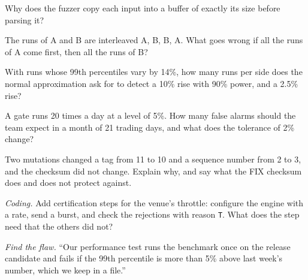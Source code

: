 \begin{exercise}[$\star$]\label{exo:ll:testing-and-deploying-low-latency-systems:2}
Why does the fuzzer copy each input into a buffer of exactly its size before parsing it?
\end{exercise}

\begin{exercise}[$\star$]\label{exo:ll:testing-and-deploying-low-latency-systems:3}
The runs of A and B are interleaved A, B, B, A. What goes wrong if all the runs of A come first, then all the runs of B?
\end{exercise}

\begin{exercise}[$\star\star$]\label{exo:ll:testing-and-deploying-low-latency-systems:4}
With runs whose 99th percentiles vary by 14\%, how many runs per side does the normal approximation ask for to detect a 10\%
rise with 90\% power, and a 2.5\% rise?
\end{exercise}

\begin{exercise}[$\star\star$]\label{exo:ll:testing-and-deploying-low-latency-systems:5}
A gate runs 20 times a day at a level of 5\%. How many false alarms should the team expect in a month of 21 trading days, and
what does the tolerance of 2\% change?
\end{exercise}

\begin{exercise}[$\star\star$]\label{exo:ll:testing-and-deploying-low-latency-systems:6}
Two mutations changed a tag from 11 to 10 and a sequence number from 2 to 3, and the checksum did not change. Explain why, and
say what the FIX checksum does and does not protect against.
\end{exercise}

\begin{exercise}[$\star\star\star$]\label{exo:ll:testing-and-deploying-low-latency-systems:7}
\emph{Coding.} Add certification steps for the venue's throttle: configure the engine with a rate, send a burst, and check the
rejections with reason \texttt{T}. What does the step need that the others did not?
\end{exercise}

\begin{exercise}[$\star\star\star$]\label{exo:ll:testing-and-deploying-low-latency-systems:8}
\emph{Find the flaw.} ``Our performance test runs the benchmark once on the release candidate and fails if the 99th percentile
is more than 5\% above last week's number, which we keep in a file.''
\end{exercise}

